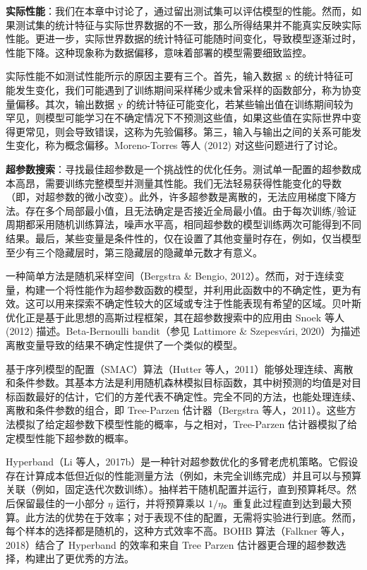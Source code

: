 \documentclass[lang=cn,newtx,10pt,scheme=chinese]{elegantbook}
\begin{document}
\textbf{实际性能}：我们在本章中讨论了，通过留出测试集可以评估模型的性能。然而，如果测试集的统计特征与实际世界数据的不一致，那么所得结果并不能真实反映实际性能。更进一步，实际世界数据的统计特征可能随时间变化，导致模型逐渐过时，性能下降。这种现象称为数据偏移，意味着部署的模型需要细致监控。

实际性能不如测试性能所示的原因主要有三个。首先，输入数据 x 的统计特征可能发生变化，我们可能遇到了训练期间采样稀少或未曾采样的函数部分，称为协变量偏移。其次，输出数据 y 的统计特征可能变化，若某些输出值在训练期间较为罕见，则模型可能学习在不确定情况下不预测这些值，如果这些值在实际世界中变得更常见，则会导致错误，这称为先验偏移。第三，输入与输出之间的关系可能发生变化，称为概念偏移。Moreno-Torres 等人 (2012) 对这些问题进行了讨论。

\textbf{超参数搜索}：寻找最佳超参数是一个挑战性的优化任务。测试单一配置的超参数成本高昂，需要训练完整模型并测量其性能。我们无法轻易获得性能变化的导数（即，对超参数的微小改变）。此外，许多超参数是离散的，无法应用梯度下降方法。存在多个局部最小值，且无法确定是否接近全局最小值。由于每次训练/验证周期都采用随机训练算法，噪声水平高，相同超参数的模型训练两次可能得到不同结果。最后，某些变量是条件性的，仅在设置了其他变量时存在，例如，仅当模型至少有三个隐藏层时，第三隐藏层的隐藏单元数才有意义。

一种简单方法是随机采样空间（Bergstra \& Bengio, 2012）。然而，对于连续变量，构建一个将性能作为超参数函数的模型，并利用此函数中的不确定性，更为有效。这可以用来探索不确定性较大的区域或专注于性能表现有希望的区域。贝叶斯优化正是基于此思想的高斯过程框架，其在超参数搜索中的应用由 Snoek 等人 (2012) 描述。Beta-Bernoulli bandit（参见 Lattimore \& Szepesvári, 2020）为描述离散变量导致的结果不确定性提供了一个类似的模型。

基于序列模型的配置（SMAC）算法（Hutter 等人，2011）能够处理连续、离散和条件参数。其基本方法是利用随机森林模拟目标函数，其中树预测的均值是对目标函数最好的估计，它们的方差代表不确定性。完全不同的方法，也能处理连续、离散和条件参数的组合，即 Tree-Parzen 估计器（Bergstra 等人，2011）。这些方法模拟了给定超参数下模型性能的概率，与之相对，Tree-Parzen 估计器模拟了给定模型性能下超参数的概率。

Hyperband（Li 等人，2017b）是一种针对超参数优化的多臂老虎机策略。它假设存在计算成本低但近似的性能测量方法（例如，未完全训练完成）并且可以与预算关联（例如，固定迭代次数训练）。抽样若干随机配置并运行，直到预算耗尽。然后保留最佳的一小部分 \(\eta\) 运行，并将预算乘以 \(1/\eta\)。重复此过程直到达到最大预算。此方法的优势在于效率；对于表现不佳的配置，无需将实验进行到底。然而，每个样本的选择都是随机的，这种方式效率不高。BOHB 算法（Falkner 等人，2018）结合了 Hyperband 的效率和来自 Tree Parzen 估计器更合理的超参数选择，构建出了更优秀的方法。
\end{document}
